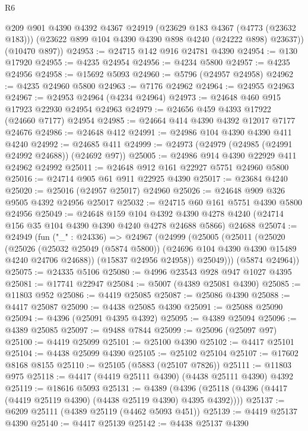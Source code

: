 \begin{lexlean}{R6}
\begin{coremodule}
        @209
        @901
        @4390
        @4392
        @4367
        @24919
        (@23629 @183 @4367 (@4773 (@23632 @183)))
        (@23622 @899 @104 @4390 @4390 @898 @4240 (@24222 @898) @23637))
      (@10470 @897))
@24953 := @24715 @142 @916 @24781 @4390
@24954 := @130 @17920
@24955 := @4235 @24954
@24956 := @4234 @5800
@24957 := @4235 @24956
@24958 := @15692 @5093
@24960 := @5796 (@24957 @24958)
@24962 := @4235 @24960 @5800
@24963 := @7176 @24962
@24964 := @24955 @24963
@24967 := @24953 @24964 (@4234 @24964)
@24973 := @24648 @460 @915 @17923 @22930 @24954 @24963
@24979 := @24656 @459 @4393 @17922 (@24660 @7177) @24954
@24985 := @24664 @414 @4390 @4392 @12017 @7177 @24676
@24986 := @24648 @412
@24991 := @24986 @104 @4390 @4390 @411 @4240
@24992 := @24685 @411
@24999 := @24973 (@24979 (@24985 (@24991 @24992 @24688)) (@24692 @97))
@25005 := @24986 @914 @4390 @22929 @411 @24962 @24992
@25011 := @24648 @912 @161 @22927 @5751 @24960 @5800
@25016 := @24714 @905 @61 @911 @22925 @4390
@25017 := @23684 @4240
@25020 := @25016 (@24957 @25017) @24960
@25026 := @24648 @909 @326 @9505 @4392 @24956 @25017
@25032 := @24715 @60 @161 @5751 @4390 @5800 @24956
@25049 := @24648
    @159
    @104
    @4392
    @4390
    @4278
    @4240
    (@24714 @156 @35 @104 @4390 @4390 @4240 @4278 @24688 @5866)
    @24688
@25074 := @24949
    (fun ("_" : @24336) =>
    @24967
      (@24999
        (@25005
          (@25011
            (@25020
              (@25026
                (@25032 @25049 (@5874 @5800))
                (@24696 @104 @4390 @4390 @15489 @4240 @24706 @24688))
              (@15837 @24956 @24958))
            @25049)))
      (@5874 @24964))
@25075 := @24335 @5106
@25080 := @4996 @23543 @928 @947 @1027 @4395
@25081 := @17741 @22947
@25084 := @5007 (@4389 @25081 @4390)
@25085 := @11803 @952
@25086 := @4419 @25085
@25087 := @25086 @4390
@25088 := @4417 @25087
@25090 := @4438 @25085 @4390
@25091 := @25088 @25090
@25094 := @4396 (@25091 @4395 @4392)
@25095 := @4389 @25094
@25096 := @4389 @25085
@25097 := @9488 @7844
@25099 := @25096 (@25097 @97)
@25100 := @4419 @25099
@25101 := @25100 @4390
@25102 := @4417 @25101
@25104 := @4438 @25099 @4390
@25105 := @25102 @25104
@25107 := @17602 @8168 @8155
@25110 := @25105 (@5883 (@25107 @7826))
@25111 := @11803 @975
@25118 := @4417 (@4419 @25111 @4390) (@4438 @25111 @4390) @4392
@25119 := @18616 @5093
@25131 := @4389
    (@4396 (@25118 (@4396 (@4417 (@4419 @25119 @4390) (@4438 @25119 @4390) @4395 @4392))))
@25137 := @6209 @25111 (@4389 @25119 (@4462 @5093 @451))
@25139 := @4419 @25137 @4390
@25140 := @4417 @25139
@25142 := @4438 @25137 @4390

\end{coremodule}
\end{lexlean}
